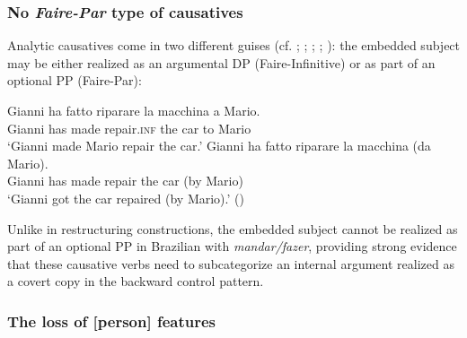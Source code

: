 \documentclass[output=paper]{langsci/langscibook}
\begin{document}
\subsubsection{No \textit{Faire-Par} type of causatives} %

Analytic causatives come in two different guises (cf. \citealt{Kayne1975}; \citealt{Huber1980}; \citealt{Burzio1986}; \citealt{Enzinger2010}; \citealt{Campanini2012}): the embedded subject may be either realized as an argumental DP  (Faire-Infinitive) or as part of an optional  PP (Faire-Par):

\ea%
         \label{ex:moreno:18}
    \ea  
    \gll Gianni ha  fatto   riparare    la   macchina a Mario.\\
         Gianni has made repair.\textsc{inf} the car    to Mario \\
    \glt ‘Gianni made Mario repair the car.’
    \ex  
    \gll Gianni ha fatto    riparare   la  macchina   (da Mario). \\
         Gianni has made repair   the car  (by Mario) \\
    \glt ‘Gianni got the car repaired (by Mario).’ (\citealt{Campanini2012})
    \z
\z

Unlike in  restructuring constructions, the embedded subject cannot be realized as part of an optional  PP in Brazilian  with \textit{mandar\slash fazer}, providing strong evidence that these causative verbs need to subcategorize an internal argument realized as a covert copy in the backward control pattern. 

    \z



\subsubsection{The loss of [person] features}%
\end{document}
